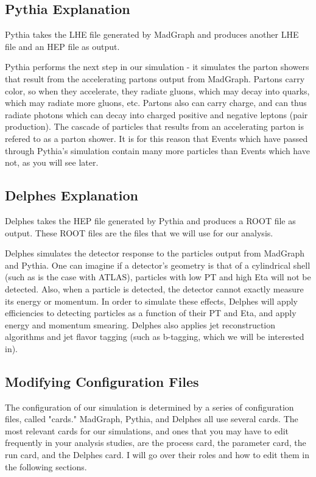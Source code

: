 \documentclass{article}
\begin{document}
\subsection{Pythia Explanation}

Pythia takes the LHE file generated by MadGraph and produces another LHE file and an HEP file as output.

\bigskip

Pythia performs the next step in our simulation - it simulates the parton showers that result from the accelerating
partons output from MadGraph. Partons carry color, so when they accelerate, they radiate gluons, which may decay
into quarks, which may radiate more gluons, etc. Partons also can carry charge, and can thus radiate photons
which can decay into charged positive and negative leptons (pair production). The cascade of particles that
results from an accelerating parton is refered to as a parton shower. It is for this reason that Events which have
passed through Pythia's simulation contain many more particles than Events which have not, as you will see later.

\subsection{Delphes Explanation}

Delphes takes the HEP file generated by Pythia and produces a ROOT file as output. These ROOT files are the files
that we will use for our analysis.

\bigskip

Delphes simulates the detector response to the particles output from MadGraph and Pythia. One can imagine if a detector's 
geometry is that of a cylindrical shell (such as is the case with ATLAS), particles
with low PT and high Eta will not be detected. Also, when a particle is detected, the detector cannot exactly measure its
energy or momentum. In order to simulate these effects, Delphes will apply efficiencies to detecting particles as a function
of their PT and Eta, and apply energy and momentum smearing. Delphes also applies jet reconstruction algorithms and jet flavor
tagging (such as b-tagging, which we will be interested in).

\subsection{Modifying Configuration Files}

The configuration of our simulation is determined by a series of configuration
files, called "cards." MadGraph, Pythia, and Delphes all use several cards.
The most relevant cards for our simulations, and ones that you may have to edit frequently
in your analysis studies, are the process card, the parameter card, the run card, and the
Delphes card. I will go over their roles and how to edit them in the following sections.
\end{document}
